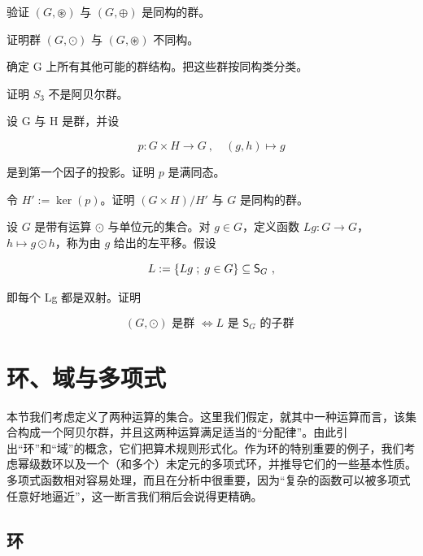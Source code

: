 \begin{exercises}
\begin{items}
\item

验证 $ (G, \circledast) $ 与 $ (G, \oplus) $ 是同构的群。

\item

证明群 $ (G,\odot) $ 与 $ (G,\circledast) $ 不同构。

\item

确定 G 上所有其他可能的群结构。把这些群按同构类分类。

\end{items}

\item

证明 $ S_{3} $ 不是阿贝尔群。

\item

设 G 与 H 是群，并设

\[
p:G\times H\to G~,\quad(g,h)\mapsto g
\]

是到第一个因子的投影。证明 $p$ 是满同态。

令 $H' := \ker(p)$。证明 $(G \times H)/H'$ 与 $G$ 是同构的群。

\item

设 $G$ 是带有运算 $\odot$ 与单位元的集合。对 $g \in G$，定义函数 $Lg: G \to G$，$h \mapsto g \odot h$，称为由 $g$ 给出的左平移。假设

\[
L:=\left\{Lg\;;\;g\in G\right\}\subseteq{\sf S}_{G}~,
\]

即每个 Lg 都是双射。证明

\[
(G,\odot)\text{ 是群 }\Longleftrightarrow L\text{ 是 }\mathsf{S}_{G}\text{ 的子群 }
\]
\end{exercises}

\section{环、域与多项式}

本节我们考虑定义了两种运算的集合。这里我们假定，就其中一种运算而言，该集合构成一个阿贝尔群，并且这两种运算满足适当的“分配律”。由此引出“环”和“域”的概念，它们把算术规则形式化。作为环的特别重要的例子，我们考虑幂级数环以及一个（和多个）未定元的多项式环，并推导它们的一些基本性质。多项式函数相对容易处理，而且在分析中很重要，因为“复杂的函数可以被多项式任意好地逼近”，这一断言我们稍后会说得更精确。

\subsection*{环}

